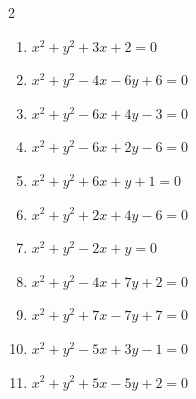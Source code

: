 \begin{multicols}{2}
\begin{enumerate}
  \item $x^{2}+y^{2}+3x+2=0$


  \item $x^{2}+y^{2}-4x-6y+6=0$


  \item $x^{2}+y^{2}-6x+4y-3=0$

        \phantom{$\displaystyle 中心\: \left(3,-2\right), \quad 半径 \ 4$}

  \item $x^{2}+y^{2}-6x+2y-6=0$

        \phantom{$\displaystyle 中心\: \left(3,-1\right), \quad 半径 \ 4$}

  \item $x^{2}+y^{2}+6x+y+1=0$


  \item $x^{2}+y^{2}+2x+4y-6=0$


\columnbreak %

\resetques

  \item $x^{2}+y^{2}-2x+y=0$


  \item $x^{2}+y^{2}-4x+7y+2=0$


  \item $x^{2}+y^{2}+7x-7y+7=0$


  \item $x^{2}+y^{2}-5x+3y-1=0$


  \item $x^{2}+y^{2}+5x-5y+2=0$


\end{enumerate}
\end{multicols}
